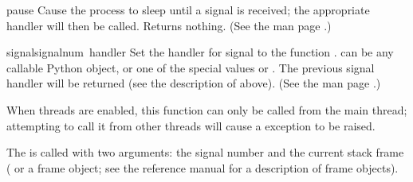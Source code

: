 \begin{funcdesc}{pause}{}
  Cause the process to sleep until a signal is received; the
  appropriate handler will then be called.  Returns nothing.  (See the
  \UNIX{} man page .)
\end{funcdesc}

\begin{funcdesc}{signal}{signalnum\, handler}
  Set the handler for signal  to the function
  .   can be any callable Python object, or
  one of the special values  or
  .  The previous signal handler will be returned
  (see the description of  above).  (See the \UNIX{}
  man page .)

  When threads are enabled, this function can only be called from the
  main thread; attempting to call it from other threads will cause a
   exception to be raised.

  The  is called with two arguments: the signal number
  and the current stack frame ( or a frame object; see the
  reference manual for a description of frame objects).
\end{funcdesc}
